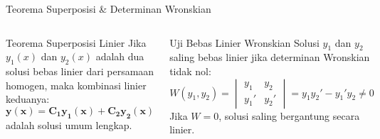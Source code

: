 \documentclass[aspectratio=169,10pt]{beamer}
\begin{document}
\begin{frame}{Teorema Superposisi \& Determinan Wronskian}
  \begin{columns}[c]
    \begin{block}{Teorema Superposisi Linier}
      Jika $y_1(x)$ dan $y_2(x)$ adalah dua solusi bebas linier dari persamaan homogen, maka kombinasi linier keduanya:
      \begin{equation*}
        \mathbf{y(x) = C_1 y_1(x) + C_2 y_2(x)}
      \end{equation*}
      adalah solusi umum lengkap.
    \end{block}

    \begin{alertblock}{Uji Bebas Linier Wronskian}
      Solusi $y_1$ dan $y_2$ saling bebas linier jika determinan Wronskian tidak nol:
      \begin{equation*}
        W(y_1, y_2) = \begin{vmatrix} y_1 & y_2 \\ y_1' & y_2' \end{vmatrix} = y_1 y_2' - y_1' y_2 \neq 0
      \end{equation*}
      Jika $W = 0$, solusi saling bergantung secara linier.
    \end{alertblock}
  \end{columns}
\end{frame}
\end{document}
